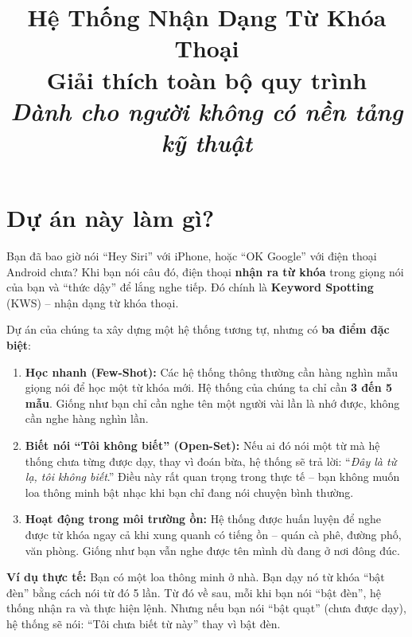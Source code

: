 \documentclass[12pt,a4paper]{article}
\title{
    \vspace{-1cm}
    {\Large\textbf{Hệ Thống Nhận Dạng Từ Khóa Thoại}} \\[0.3cm]
    {\large Giải thích toàn bộ quy trình} \\[0.2cm]
    {\normalsize\textit{Dành cho người không có nền tảng kỹ thuật}}
}
\author{}
\date{}
\begin{document}
\maketitle
\thispagestyle{fancy}

\tableofcontents
\newpage


\section{Dự án này làm gì?}

Bạn đã bao giờ nói ``Hey Siri'' với iPhone, hoặc ``OK Google'' với điện thoại Android
chưa? Khi bạn nói câu đó, điện thoại \textbf{nhận ra từ khóa} trong giọng nói của bạn
và ``thức dậy'' để lắng nghe tiếp. Đó chính là \textbf{Keyword Spotting} (KWS) --
nhận dạng từ khóa thoại.

Dự án của chúng ta xây dựng một hệ thống tương tự, nhưng có \textbf{ba điểm đặc biệt}:

\begin{enumerate}[leftmargin=2cm]
    \item \textbf{Học nhanh (Few-Shot):}
    Các hệ thống thông thường cần hàng nghìn mẫu giọng nói để học một từ khóa mới.
    Hệ thống của chúng ta chỉ cần \textbf{3 đến 5 mẫu}. Giống như bạn chỉ cần nghe
    tên một người vài lần là nhớ được, không cần nghe hàng nghìn lần.

    \item \textbf{Biết nói ``Tôi không biết'' (Open-Set):}
    Nếu ai đó nói một từ mà hệ thống chưa từng được dạy, thay vì đoán bừa,
    hệ thống sẽ trả lời: ``\textit{Đây là từ lạ, tôi không biết}.'' Điều này rất
    quan trọng trong thực tế -- bạn không muốn loa thông minh bật nhạc khi bạn
    chỉ đang nói chuyện bình thường.

    \item \textbf{Hoạt động trong môi trường ồn:}
    Hệ thống được huấn luyện để nghe được từ khóa ngay cả khi xung quanh có
    tiếng ồn -- quán cà phê, đường phố, văn phòng. Giống như bạn vẫn nghe được
    tên mình dù đang ở nơi đông đúc.
\end{enumerate}

\begin{examplebox}
\textbf{Ví dụ thực tế:} Bạn có một loa thông minh ở nhà. Bạn dạy nó từ khóa
``bật đèn'' bằng cách nói từ đó 5 lần. Từ đó về sau, mỗi khi bạn nói ``bật đèn'',
hệ thống nhận ra và thực hiện lệnh. Nhưng nếu bạn nói ``bật quạt'' (chưa được dạy),
hệ thống sẽ nói: ``Tôi chưa biết từ này'' thay vì bật đèn.
\end{examplebox}
\end{document}
